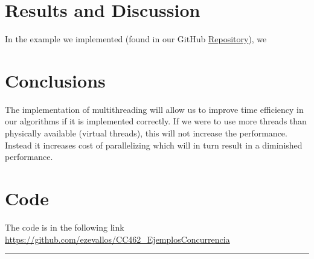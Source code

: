 \documentclass[10pt,a4paper]{article}
\theoremstyle{definition}
\begin{document}
\section{Results and Discussion}


In the example we implemented (found in our GitHub \href{https://github.com/ezevallos/CC462_Battle-City}{Repository}), we 

\section{Conclusions}
The implementation of multithreading will allow us to improve time efficiency in our algorithms if it is implemented correctly. If we were to use more threads than physically available (virtual threads), this will not increase
the performance. Instead it increases cost of parallelizing which will in turn result in a diminished performance.
\section{Code}
The code is in the following link \url{https://github.com/ezevallos/CC462_EjemplosConcurrencia}



\vspace{20pt}
\hrule
\vspace{10pt}

\nocite{*}
%



\end{document}
